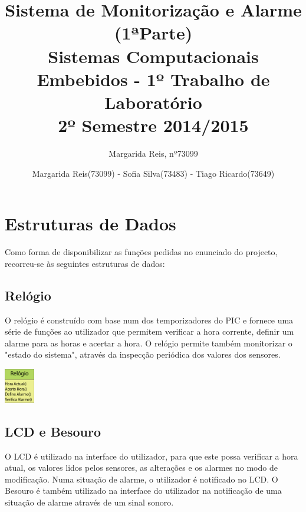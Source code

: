 \documentclass{article}
\begin{document}
	\title{\textbf{Sistema de Monitorização e Alarme (1ªParte)} \\ \large Sistemas Computacionais Embebidos - 1º Trabalho de Laboratório \\ \large 2º Semestre 2014/2015}
	\author{Margarida Reis, nº73099}
	\author{Margarida Reis(73099) - Sofia Silva(73483) - Tiago Ricardo(73649)}
	
	\maketitle	
	
	
	\section{Estruturas de Dados}
	Como forma de disponibilizar as funções pedidas no enunciado do projecto, recorreu-se às seguintes estruturas de dados:
	
	\subsection{Relógio}		
	
		
		O relógio é construído com base num dos temporizadores do PIC e fornece uma série de funções ao utilizador que permitem verificar a hora corrente, definir um alarme para as horas e acertar a hora. O relógio permite também monitorizar o "estado do sistema", através da inspecção periódica dos valores dos sensores.
		
	\begin{center}
		\includegraphics[width=0.10\textwidth]{scereport_01}
	\end{center}
	

	
	
	\subsection{LCD e Besouro}		
	
	O LCD é utilizado na interface do utilizador, para que este possa verificar a hora atual, os valores lidos pelos sensores, as alterações e os alarmes no modo de modificação. Numa situação de alarme, o utilizador é notificado no LCD. O Besouro é também utilizado na interface do utilizador na notificação de uma situação de alarme através de um sinal sonoro. 
	
\end{document}
